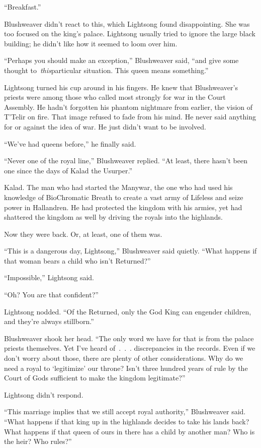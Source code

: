 “Breakfast.”

Blushweaver didn’t react to this, which Lightsong found disappointing. She was too focused on the king’s palace. Lightsong usually tried to ignore the large black building; he didn’t like how it seemed to loom over him.

“Perhaps you should make an exception,” Blushweaver said, “and give some thought to~\textit{this}particular situation. This queen means something.”

Lightsong turned his cup around in his fingers. He knew that Blushweaver’s priests were among those who called most strongly for war in the Court Assembly. He hadn’t forgotten his phantom nightmare from earlier, the vision of T’Telir on fire. That image refused to fade from his mind. He never said anything for or against the idea of war. He just didn’t want to be involved.

“We’ve had queens before,” he finally said.

“Never one of the royal line,” Blushweaver replied. “At least, there hasn’t been one since the days of Kalad the Usurper.”

Kalad. The man who had started the Manywar, the one who had used his knowledge of BioChromatic Breath to create a vast army of Lifeless and seize power in Hallandren. He had protected the kingdom with his armies, yet had shattered the kingdom as well by driving the royals into the highlands.

Now they were back. Or, at least, one of them was.

“This is a dangerous day, Lightsong,” Blushweaver said quietly. “What happens if that woman bears a child who isn’t Returned?”

“Impossible,” Lightsong said.

“Oh? You are that confident?”

Lightsong nodded. “Of the Returned, only the God King can engender children, and they’re always stillborn.”

Blushweaver shook her head. “The only word we have for that is from the palace priests themselves. Yet I’ve heard of~.~.~. discrepancies in the records. Even if we don’t worry about those, there are plenty of other considerations. Why do we need a royal to ‘legitimize’ our throne? Isn’t three hundred years of rule by the Court of Gods sufficient to make the kingdom legitimate?”

Lightsong didn’t respond.

“This marriage implies that we still accept royal authority,” Blushweaver said. “What happens if that king up in the highlands decides to take his lands back? What happens if that queen of ours in there has a child by another man? Who is the heir? Who rules?”

